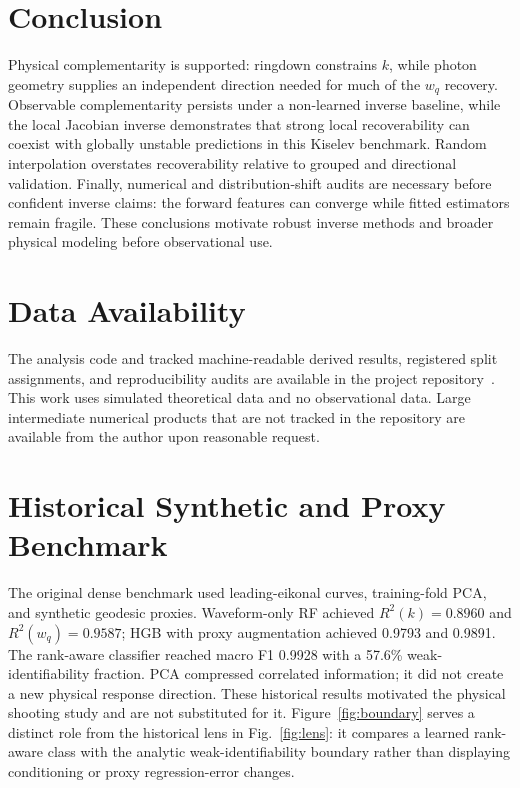 \documentclass[11pt]{article}
\newcommand{\wq}{w_q}
\begin{document}
\section{Conclusion}
Physical complementarity is supported: ringdown constrains $k$, while photon
geometry supplies an independent direction needed for much of the $\wq$
recovery. Observable complementarity persists under a non-learned inverse
baseline, while the local Jacobian inverse demonstrates that strong local
recoverability can coexist with globally unstable predictions in this Kiselev
benchmark. Random interpolation overstates recoverability relative to grouped
and directional validation. Finally, numerical and distribution-shift audits
are necessary before confident inverse claims: the forward features can
converge while fitted estimators remain fragile. These conclusions motivate
robust inverse methods and broader physical modeling before observational use.

\section*{Data Availability}
The analysis code and tracked machine-readable derived results, registered
split assignments, and reproducibility audits are available in the project
repository~\cite{palomino2026software}. This work uses simulated theoretical data and no observational
data. Large intermediate numerical products that are not tracked in the
repository are available from the author upon reasonable request.

\FloatBarrier
\appendix
\section{Historical Synthetic and Proxy Benchmark}
\label{app:historical}
The original dense benchmark used leading-eikonal curves, training-fold PCA,
and synthetic geodesic proxies. Waveform-only RF achieved
$R^2(k)=0.8960$ and $R^2(\wq)=0.9587$; HGB with proxy augmentation achieved
0.9793 and 0.9891. The rank-aware classifier reached macro F1 0.9928 with a
57.6\% weak-identifiability fraction. PCA compressed correlated information; it
did not create a new physical response direction. These historical results
motivated the physical shooting study and are not substituted for it.
Figure~\ref{fig:boundary} serves a distinct role from the historical lens in
Fig.~\ref{fig:lens}: it compares a learned rank-aware class with the analytic
weak-identifiability boundary rather than displaying conditioning or proxy
regression-error changes.
\end{document}
